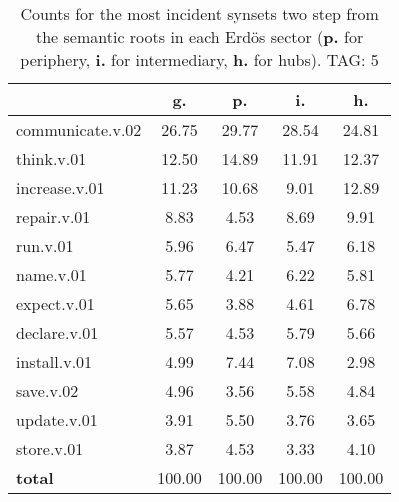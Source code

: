 \begin{table}[h!]
\begin{center}
\begin{tabular}{| l | c | c | c | c |}\hline
 & g. & p. & i. & h. \\\hline
communicate.v.02 & 26.75  & 29.77  & 28.54  & 24.81 \\\hline
think.v.01 & 12.50  & 14.89  & 11.91  & 12.37 \\\hline
increase.v.01 & 11.23  & 10.68  & 9.01  & 12.89 \\\hline
repair.v.01 & 8.83  & 4.53  & 8.69  & 9.91 \\\hline
run.v.01 & 5.96  & 6.47  & 5.47  & 6.18 \\\hline
name.v.01 & 5.77  & 4.21  & 6.22  & 5.81 \\\hline
expect.v.01 & 5.65  & 3.88  & 4.61  & 6.78 \\\hline
declare.v.01 & 5.57  & 4.53  & 5.79  & 5.66 \\\hline
install.v.01 & 4.99  & 7.44  & 7.08  & 2.98 \\\hline
save.v.02 & 4.96  & 3.56  & 5.58  & 4.84 \\\hline
update.v.01 & 3.91  & 5.50  & 3.76  & 3.65 \\\hline
store.v.01 & 3.87  & 4.53  & 3.33  & 4.10 \\\hline
{{\bf total}} & 100.00  & 100.00  & 100.00  & 100.00 \\\hline
\end{tabular}
\caption{Counts for the most incident synsets two step from the semantic roots in each Erd\"os sector ({\bf p.} for periphery, {\bf i.} for intermediary, {\bf h.} for hubs). TAG: 5}
\end{center}
\end{table}